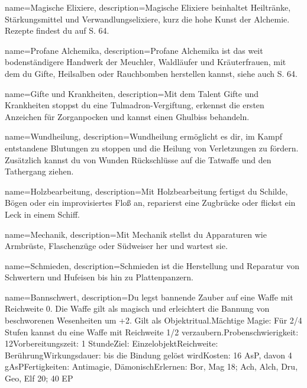 {
    name={Magische Elixiere},
    description={Magische Elixiere beinhaltet Heiltränke, Stärkungsmittel und Verwandlungselixiere, kurz die hohe Kunst der Alchemie. Rezepte findest du auf S. 64.}
}


{
    name={Profane Alchemika},
    description={Profane Alchemika ist das weit bodenständigere Handwerk der Meuchler, Waldläufer und Kräuterfrauen, mit dem du Gifte, Heilsalben oder Rauchbomben herstellen kannst, siehe auch S. 64.}
}


{
    name={Gifte und Krankheiten},
    description={Mit dem Talent Gifte und Krankheiten stoppst du eine Tulmadron-Vergiftung, erkennst die ersten Anzeichen für Zorganpocken und kannst einen Ghulbiss behandeln.}
}


{
    name={Wundheilung},
    description={Wundheilung ermöglicht es dir, im Kampf entstandene Blutungen zu stoppen und die Heilung von Verletzungen zu fördern. Zusätzlich kannst du von Wunden Rückschlüsse auf die Tatwaffe und den Tathergang ziehen.}
}


{
    name={Holzbearbeitung},
    description={Mit Holzbearbeitung fertigst du Schilde, Bögen oder ein improvisiertes Floß an, reparierst eine Zugbrücke oder flickst ein Leck in einem Schiff.}
}


{
    name={Mechanik},
    description={Mit Mechanik stellst du Apparaturen wie Armbrüste, Flaschenzüge oder Südweiser her und wartest sie.}
}


{
    name={Schmieden},
    description={Schmieden ist die Herstellung und Reparatur von Schwertern und Hufeisen bis hin zu Plattenpanzern.}
}


{
    name={Bannschwert},
    description={Du legst bannende Zauber auf eine Waffe mit Reichweite 0. Die Waffe gilt als magisch und erleichtert die Bannung von beschworenen Wesenheiten um +2. Gilt als Objektritual.\newline Mächtige Magie: Für 2/4 Stufen kannst du eine Waffe mit Reichweite 1/2 verzaubern.\newline Probenschwierigkeit: 12\newline Vorbereitungszeit: 1 Stunde\newline Ziel: Einzelobjekt\newline Reichweite: Berührung\newline Wirkungsdauer: bis die Bindung gelöst wird\newline Kosten: 16 AsP, davon 4 gAsP\newline Fertigkeiten: Antimagie, Dämonisch\newline Erlernen: Bor, Mag 18; Ach, Alch, Dru, Geo, Elf 20; 40 EP}
}


